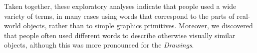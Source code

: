 \documentclass[10pt,letterpaper]{article}
\begin{document}
Taken together, these exploratory analyses indicate that people used a wide variety of terms, in many cases using words that correspond to the parts of real-world objects, rather than to simple graphics primitives.
Moreover, we discovered that people often used different words to describe otherwise visually similar objects, although this was more pronounced for the \textit{Drawings}.






\end{document}
